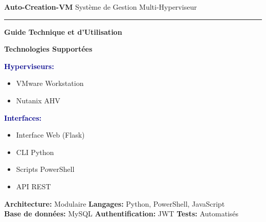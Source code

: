\documentclass[11pt,a4paper]{article}
\begin{document}
\begin{titlepage}
    \centering
    \vspace*{2cm}
    {\Huge\bfseries\color{primaryblue}Auto-Creation-VM}
    \vspace{0.5cm}
    {\Large\color{secondaryblue}Système de Gestion Multi-Hyperviseur}
    \vspace{1cm}
    \textcolor{primaryblue}{\rule{\linewidth}{2pt}}
    \vspace{1cm}
    {\LARGE\bfseries\color{darkblue}Guide Technique et d'Utilisation}
    \vspace{2cm}
    \begin{tcolorbox}[
        colback=lightblue,
        colframe=primaryblue,
        width=0.8\textwidth,
        arc=5pt,
        boxrule=1pt
    ]
        \centering
        \textbf{\color{primaryblue}Technologies Supportées}
        \vspace{0.5cm}
        \begin{multicols}{2}
            \textcolor{darkblue}{\textbf{Hyperviseurs:}}
            \begin{itemize}[leftmargin=*]
                \item VMware Workstation
                \item Nutanix AHV
            \end{itemize}
            
            \textcolor{darkblue}{\textbf{Interfaces:}}
            \begin{itemize}[leftmargin=*]
                \item Interface Web (Flask)
                \item CLI Python
                \item Scripts PowerShell
                \item API REST
            \end{itemize}
        \end{multicols}
    \end{tcolorbox}
    \vfill
    \textcolor{grayblue}{\small
        \textbf{Architecture:} Modulaire \textbullet{} \textbf{Langages:} Python, PowerShell, JavaScript \\
        \textbf{Base de données:} MySQL \textbullet{} \textbf{Authentification:} JWT \textbullet{} \textbf{Tests:} Automatisés
    }
\end{titlepage}

\newpage
\tableofcontents
\newpage

\end{document}
